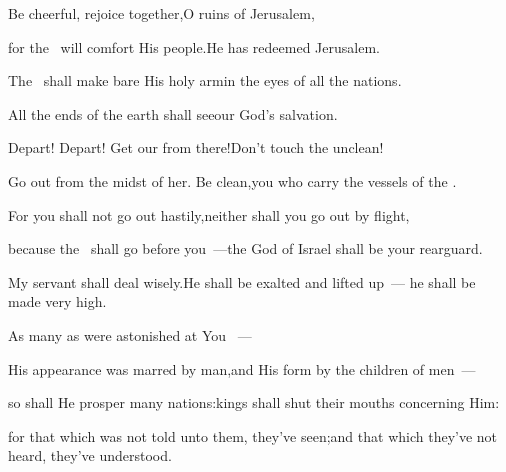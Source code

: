 \begin{inparaenum}
  \pa{} Be cheerful, rejoice together,\pa{}O ruins of Jerusalem,%

  \pb{}for the \lord\ will comfort His people.\pa{}He has redeemed Jerusalem.%

  \pa{} The \lord\ shall make bare His holy arm\pa{}in the eyes of all the nations.%

  \pb{}All the ends of the earth shall see\pa{}our God's salvation.\bigskip%

  \pb{} Depart! Depart! Get our from there!\pa{}Don't touch the unclean!%

  \pc{}Go out from the midst of her. Be clean,\pa{}you who carry the vessels of the \lord.%

  \pb{} For you shall not go out hastily,\pa{}neither shall you go out by flight,%

  \pc{}because the \lord\ shall go before you~---\pa{}the God of Israel shall be your rearguard.\bigskip%

  \pa{} My servant shall deal wisely.\pa{}He shall be exalted and lifted up~--- he shall be made very high.%

  \pa{} As many as were astonished at You%
  ~---%

  \pb{}His appearance was marred by man,\pa{}and His form by the children of men~---%

  \pa{} so shall He prosper many nations:\pa{}kings shall shut their mouths concerning Him:%

  \pb{}for that which was not told unto them, they've seen;\pa{}and that which they've not heard, they've understood.%
\end{inparaenum}
